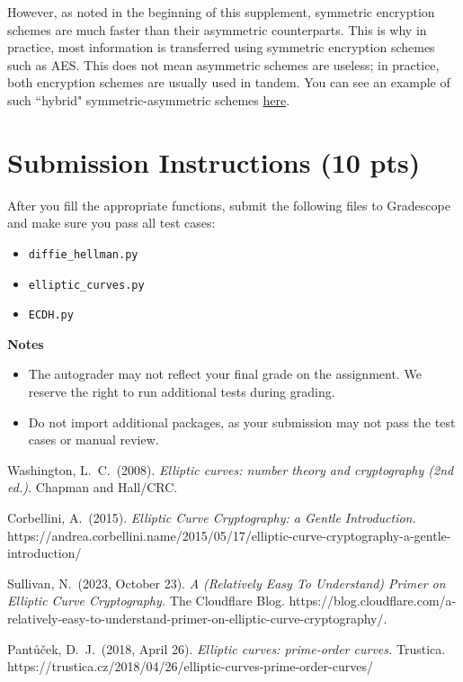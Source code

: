 \documentclass{article}
\begin{document}
    \vspace{3mm}
    However, as noted in the beginning of this supplement, symmetric encryption schemes are much faster than their asymmetric counterparts. This is why in practice, most information is transferred using symmetric encryption schemes such as AES. This does not mean asymmetric schemes are useless; in practice, both encryption schemes are usually used in tandem. You can see an example of such ``hybrid" symmetric-asymmetric schemes \href{https://github.com/nakov/Practical-Cryptography-for-Developers-Book/blob/master/asymmetric-key-ciphers/ecc-encryption-decryption.md}{here}.

\section*{Submission Instructions (10 pts)}
    After you fill the appropriate functions, submit the following files to Gradescope and make sure you pass all test cases:
    \begin{itemize}
        \item \lstinline{diffie_hellman.py}
        \item \lstinline{elliptic_curves.py}
        \item \lstinline{ECDH.py}
    \end{itemize}

    \vspace{3mm}
    \textbf{Notes}
    \begin{itemize}
        \item The autograder may not reflect your final grade on the assignment. We reserve the right to run additional tests during grading.
        \item Do not import additional packages, as your submission may not pass the test cases or manual review.
    \end{itemize}

\begin{thebibliography}{9}
    Washington, L.\ C.\ (2008). \textit{Elliptic curves: number theory and cryptography (2nd ed.).} Chapman and Hall/CRC.

    Corbellini, A.\ (2015). \textit{Elliptic Curve Cryptography: a Gentle Introduction.}\\
    https://andrea.corbellini.name/2015/05/17/elliptic-curve-cryptography-a-gentle-introduction/
    
    Sullivan, N.\ (2023, October 23). \textit{A (Relatively Easy To Understand) Primer on Elliptic Curve Cryptography.} The Cloudflare Blog. https://blog.cloudflare.com/a-relatively-easy-to-understand-primer-on-elliptic-curve-cryptography/.

    Pantůček, D.\ J.\ (2018, April 26). \textit{Elliptic curves: prime-order curves.} Trustica. \\https://trustica.cz/2018/04/26/elliptic-curves-prime-order-curves/ 
\end{thebibliography}
\end{document}

